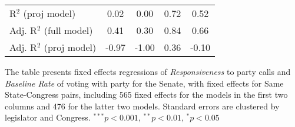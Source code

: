\documentclass[12pt]{article}
\begin{document}
\begin{table}[!htbp]
\begin{threeparttable}
\begin{tabular}{l c c c c }
R$^2$ (proj model)                & 0.02        & 0.00     & 0.72        & 0.52         \\
Adj. R$^2$ (full model)           & 0.41        & 0.30     & 0.84        & 0.66         \\
Adj. R$^2$ (proj model)           & -0.97       & -1.00    & 0.36        & -0.10        \\
\hline
\end{tabular}
\begin{tablenotes}
   \item
   The table presents fixed effects regressions of \textit{Responsiveness} to party calls and \textit {Baseline Rate} of voting with party for the Senate, with fixed effects for Same State-Congress pairs, including 565 fixed effects for the models in the first two columns and 476 for the latter two models.  Standard errors are clustered by legislator and Congress.
   $^{***}p<0.001$, $^{**}p<0.01$, $^*p<0.05$
 \end{tablenotes}
\end{threeparttable}
\end{table}

\clearpage



\end{document}
